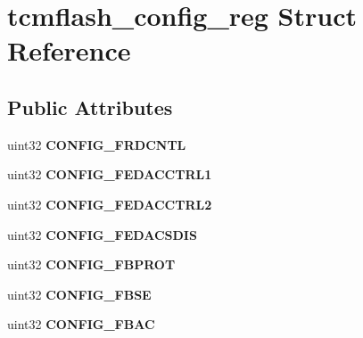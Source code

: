 \hypertarget{structtcmflash__config__reg}{}\section{tcmflash\+\_\+config\+\_\+reg Struct Reference}
\label{structtcmflash__config__reg}
\subsection*{Public Attributes}
\begin{DoxyCompactItemize}
\item 
\mbox{\label{structtcmflash__config__reg_ae5f9a33026ee7f3040b53a865de9185c}} 
uint32 {\bfseries C\+O\+N\+F\+I\+G\+\_\+\+F\+R\+D\+C\+N\+TL}
\item 
\mbox{\label{structtcmflash__config__reg_a5b96266d3144e21ecd41a64a6e1c8196}} 
uint32 {\bfseries C\+O\+N\+F\+I\+G\+\_\+\+F\+E\+D\+A\+C\+C\+T\+R\+L1}
\item 
\mbox{\label{structtcmflash__config__reg_abeff04ba080293d153ead1db01e45d78}} 
uint32 {\bfseries C\+O\+N\+F\+I\+G\+\_\+\+F\+E\+D\+A\+C\+C\+T\+R\+L2}
\item 
\mbox{\label{structtcmflash__config__reg_aa4aec9812c147b9ecebaba0422ae3e9e}} 
uint32 {\bfseries C\+O\+N\+F\+I\+G\+\_\+\+F\+E\+D\+A\+C\+S\+D\+IS}
\item 
\mbox{\label{structtcmflash__config__reg_a282b1ce3da413d7a6fc9c19ecf7b907e}} 
uint32 {\bfseries C\+O\+N\+F\+I\+G\+\_\+\+F\+B\+P\+R\+OT}
\item 
\mbox{\label{structtcmflash__config__reg_a858b1043c51e9407692c3caca12e361d}} 
uint32 {\bfseries C\+O\+N\+F\+I\+G\+\_\+\+F\+B\+SE}
\item 
\mbox{\label{structtcmflash__config__reg_a83355636115fd01c049ceae5763769ad}} 
uint32 {\bfseries C\+O\+N\+F\+I\+G\+\_\+\+F\+B\+AC}
\item 
\mbox{\label{structtcmflash__config__reg_ac520934fefee25e4f370da0a76e109bf}} 

\end{DoxyCompactItemize}
